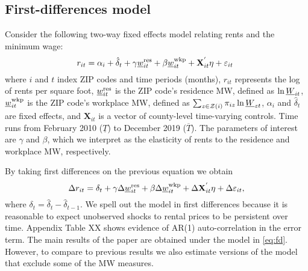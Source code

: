     
\subsection{First-differences model}

Consider the following two-way fixed effects model relating rents and the 
minimum wage:
\begin{equation*} \label{eq:did_lev}
    r_{it} = \alpha_i + \hat{\delta}_t 
           + \gamma \underline{w}^{\text{res}}_{it} + \beta \underline{w}^{\text{wkp}}_{it}
           + \mathbf{X}^{'}_{it}\eta
           + \varepsilon_{it} \ 
\end{equation*}    
where
$i$ and $t$ index ZIP codes and time periods (months),
$r_{it}$ represents the log of rents per square foot,
$\underline{w}^{\text{res}}_{it}$ is the ZIP code's residence MW, defined as 
$\ln \underline{W}_{it}$,
$\underline{w}^{\text{wkp}}_{it}$ is the ZIP code's workplace MW, defined as 
$\sum_{z\in\mathcal{Z}(i)} \pi_{iz}\ln \underline{W}_{zt}$,
$\alpha_i$ and $\hat{\delta}_t$ are fixed effects, and 
$\mathbf{X}_{it}$ is a vector of county-level time-varying controls.
Time runs from February 2010 ($\underline{T}$) to December 2019 ($\overline{T}$).
The parameters of interest are $\gamma$ and $\beta$, which we interpret as the 
elasticity of rents to the residence and workplace MW, respectively.

By taking first differences on the previous equation we obtain
\begin{equation}\label{eq:fd}
    \Delta r_{it} = \delta_t
                  + \gamma \Delta \underline{w}^{\text{res}}_{it} + \beta \Delta \underline{w}^{\text{wkp}}_{it}
                  + \Delta \mathbf{X}^{'}_{it}\eta
                  + \Delta \varepsilon_{it} ,
\end{equation}
where $\delta_t = \hat{\delta}_t - \hat{\delta}_{t-1}$.
We spell out the model in first differences because it is reasonable to expect 
unobserved shocks to rental prices to be persistent over time. 
Appendix Table XX shows evidence of AR(1) auto-correlation in the error term.
The main results of the paper are obtained under the model in \ref{eq:fd}. 
However, to compare to previous results we also estimate versions of the model
that exclude some of the MW measures.



